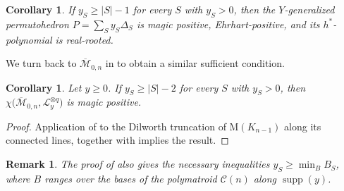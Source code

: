 \documentclass[11pt,a4paper,reqno]{amsart}
\theoremstyle{results}
\newtheorem{corollary}[thm]{Corollary}
\theoremstyle{definitions}
\newtheorem{remark}[thm]{Remark}
\newcommand{\M}{\mathrm{M}}
\DeclareMathOperator{\supp}{supp}
\newcommand{\hstar}{h^{*}}
\newcommand{\cL}{\mathcal{L}}
\newcommand{\Cer}{\mathcal{C}}
\newcommand{\Mbar}{\overline{\mathcal M}}
\begin{document}
\begin{corollary}\label{cor:ygp}
  If $y_S \geqslant |S| - 1$ for every $S$ with $y_S > 0$, then the $Y$-generalized
  permutohedron $P = \sum_S y_S\Delta_S$ is magic
  positive, Ehrhart-positive, and its $\hstar$-polynomial is real-rooted.
\end{corollary}



We turn back to $\Mbar_{0,n}$ in
 to obtain a similar sufficient condition. 
\begin{corollary}\label{thm:m0n-sufficient}
  Let $y \geqslant 0$.  If $y_S \geqslant |S| - 2$ for every $S$ with $y_S > 0$,
  then $\chi\big(\Mbar_{0,n}, \cL_y^{\otimes q}\big)$ is magic positive.
\end{corollary}

\begin{proof}
  Application of  to the Dilworth truncation of $\M(K_{n-1})$ along its connected lines, together with  implies the result. 
\end{proof}

\begin{remark}
  The proof of  also gives the necessary inequalities
  $y_S\geqslant\min_B B_S$, where $B$ ranges over the bases of
  the polymatroid $\Cer(n)$ along $\supp(y)$.
\end{remark}



\end{document}
